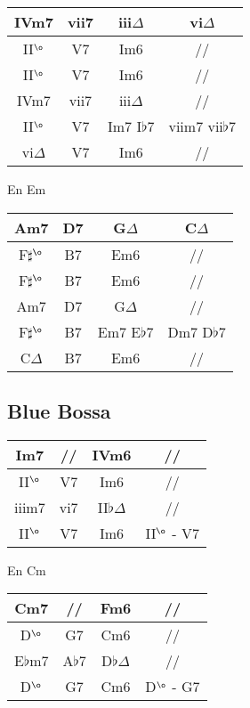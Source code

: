 \documentclass[a4paper,10pt]{article}
\begin{document}
\begin{tabular}{ | c | c | c | c | } \hline			
	IVm7 & vii7 & iii$\Delta$ & vi$\Delta$ \\ \hline  
	II$^{\o}$ & V7 & Im6 & // \\ \hline  \hline
	II$^{\o}$ & V7 & Im6 & // \\ \hline  
	IVm7 & vii7 & iii$\Delta$ & // \\ \hline  \hline
	II$^{\o}$ & V7 & Im7 I$\flat$7 & viim7 vii$\flat$7 \\ \hline  
	vi$\Delta$ & V7 & Im6 & // \\ \hline  
\end{tabular}
\newline
\newline

En Em

\begin{tabular}{ | c | c | c | c | } \hline			
	Am7 & D7 & G$\Delta$ & C$\Delta$ \\ \hline  
	F$\sharp^{\o}$ & B7 & Em6 & // \\ \hline  \hline
	F$\sharp^{\o}$ & B7 & Em6 & // \\ \hline  
	Am7 & D7 & G$\Delta$ & // \\ \hline  \hline
	F$\sharp^{\o}$ & B7 & Em7 E$\flat$7 & Dm7 D$\flat$7 \\ \hline  
	C$\Delta$ & B7 & Em6 & // \\ \hline  
\end{tabular}
\newpage

\subsection{Blue Bossa}

\begin{tabular}{ | c | c | c | c | } \hline			
	Im7 & // & IVm6 & // \\ \hline  
	II$^{\o}$ & V7 & Im6 & // \\ \hline  
	iiim7 & vi7 & II$\flat\Delta$ & // \\ \hline  
	II$^{\o}$ & V7 & Im6 & II$^{\o}$ - V7 \\ \hline  
\end{tabular}
\newline
\newline

En Cm

\begin{tabular}{ | c | c | c | c | } \hline			
	Cm7 & // & Fm6 & // \\ \hline  
	D$^{\o}$ & G7 & Cm6 & // \\ \hline  
	E$\flat$m7 & A$\flat$7 & D$\flat\Delta$ & // \\ \hline  
	D$^{\o}$ & G7 & Cm6 & D$^{\o}$ - G7 \\ \hline  
\end{tabular}
\newpage
\end{document}
